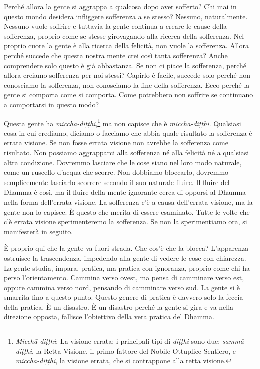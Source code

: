 Perché allora la gente si aggrappa a qualcosa dopo aver sofferto? Chi
mai in questo mondo desidera infliggere sofferenza a se stesso? Nessuno,
naturalmente. Nessuno vuole soffrire e tuttavia la gente continua a
creare le cause della sofferenza, proprio come se stesse girovagando
alla ricerca della sofferenza. Nel proprio cuore la gente è alla ricerca
della felicità, non vuole la sofferenza. Allora perché succede che
questa nostra mente crei così tanta sofferenza? Anche comprendere solo
questo è già abbastanza. Se non ci piace la sofferenza, perché allora
creiamo sofferenza per noi stessi? Capirlo è facile, succede solo perché
non conosciamo la sofferenza, non conosciamo la fine della sofferenza.
Ecco perché la gente si comporta come si comporta. Come potrebbero non
soffrire se continuano a comportarsi in questo modo?

Questa gente ha \emph{micchā-diṭṭhi},\footnote{\emph{Micchā-diṭṭhi}: La
  visione errata; i principali tipi di \emph{diṭṭhi} sono due:
  \emph{sammā-diṭṭhi}, la Retta Visione, il primo fattore del Nobile
  Ottuplice Sentiero, e \emph{micchā-diṭṭhi}, la visione errata, che si
  contrappone alla retta visione.} ma non capisce che è
\emph{micchā-diṭṭhi}. Qualsiasi cosa in cui crediamo, diciamo o facciamo
che abbia quale risultato la sofferenza è errata visione. Se non fosse
errata visione non avrebbe la sofferenza come risultato. Non possiamo
aggrapparci alla sofferenza né alla felicità né a qualsiasi altra
condizione. Dovremmo lasciare che le cose siano nel loro modo naturale,
come un ruscello d'acqua che scorre. Non dobbiamo bloccarlo, dovremmo
semplicemente lasciarlo scorrere secondo il suo naturale fluire. Il
fluire del Dhamma è così, ma il fluire della mente ignorante cerca di
opporsi al Dhamma nella forma dell'errata visione. La sofferenza c'è a
causa dell'errata visione, ma la gente non lo capisce. È questo che
merita di essere esaminato. Tutte le volte che c'è errata visione
sperimenteremo la sofferenza. Se non la sperimentiamo ora, si
manifesterà in seguito.

È proprio qui che la gente va fuori strada. Che cos'è che la blocca?
L'apparenza ostruisce la trascendenza, impedendo alla gente di vedere le
cose con chiarezza. La gente studia, impara, pratica, ma pratica con
ignoranza, proprio come chi ha perso l'orientamento. Cammina verso
ovest, ma pensa di camminare verso est, oppure cammina verso nord,
pensando di camminare verso sud. La gente si è smarrita fino a questo
punto. Questo genere di pratica è davvero solo la feccia della pratica.
È un disastro. È un disastro perché la gente si gira e va nella
direzione opposta, fallisce l'obiettivo della vera pratica del Dhamma.


